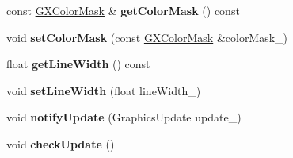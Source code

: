 \begin{DoxyCompactItemize}
\item 
const \hyperlink{class_i_dream_sky_1_1_g_x_color_mask}{G\+X\+Color\+Mask} \& {\bfseries get\+Color\+Mask} () const \hypertarget{class_i_dream_sky_1_1_g_x_context_a5752edc69ea61702a007215e32f266e5}{}\label{class_i_dream_sky_1_1_g_x_context_a5752edc69ea61702a007215e32f266e5}

\item 
void {\bfseries set\+Color\+Mask} (const \hyperlink{class_i_dream_sky_1_1_g_x_color_mask}{G\+X\+Color\+Mask} \&color\+Mask\+\_\+)\hypertarget{class_i_dream_sky_1_1_g_x_context_a16dfc4c6be174f066556863cd0ca9f30}{}\label{class_i_dream_sky_1_1_g_x_context_a16dfc4c6be174f066556863cd0ca9f30}

\item 
float {\bfseries get\+Line\+Width} () const \hypertarget{class_i_dream_sky_1_1_g_x_context_a236e28580c69e09c56b174930446f534}{}\label{class_i_dream_sky_1_1_g_x_context_a236e28580c69e09c56b174930446f534}

\item 
void {\bfseries set\+Line\+Width} (float line\+Width\+\_\+)\hypertarget{class_i_dream_sky_1_1_g_x_context_a36b5a7f559e2d38a98e6def3ede9e640}{}\label{class_i_dream_sky_1_1_g_x_context_a36b5a7f559e2d38a98e6def3ede9e640}

\item 
void {\bfseries notify\+Update} (Graphics\+Update update\+\_\+)\hypertarget{class_i_dream_sky_1_1_g_x_context_a183c907d8096fa05d3805ba8223c84ad}{}\label{class_i_dream_sky_1_1_g_x_context_a183c907d8096fa05d3805ba8223c84ad}

\item 
void {\bfseries check\+Update} ()\hypertarget{class_i_dream_sky_1_1_g_x_context_a6729135b8e8d7adda3e5f2503bc84cbc}{}\label{class_i_dream_sky_1_1_g_x_context_a6729135b8e8d7adda3e5f2503bc84cbc}

\end{DoxyCompactItemize}
